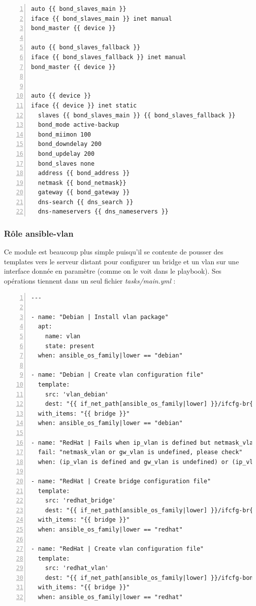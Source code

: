 \documentclass[14 pt,a4paper]{extreport}
\begin{document}
\begin{framed}
\begin{Verbatim}[fontsize=\scriptsize,numbers=left]
auto {{ bond_slaves_main }}
iface {{ bond_slaves_main }} inet manual
bond_master {{ device }}

auto {{ bond_slaves_fallback }}
iface {{ bond_slaves_fallback }} inet manual
bond_master {{ device }}


auto {{ device }}
iface {{ device }} inet static
  slaves {{ bond_slaves_main }} {{ bond_slaves_fallback }}
  bond_mode active-backup
  bond_miimon 100
  bond_downdelay 200
  bond_updelay 200
  bond_slaves none
  address {{ bond_address }}
  netmask {{ bond_netmask}}
  gateway {{ bond_gateway }}
  dns-search {{ dns_search }}
  dns-nameservers {{ dns_nameservers }}

\end{Verbatim}
\end{framed}


\subsubsection*{Rôle ansible-vlan}

Ce module est beaucoup plus simple puisqu'il se contente de pousser des templates vers le serveur distant pour configurer un bridge et un vlan sur une interface donnée en paramètre (comme on le voit dans le playbook). Ses opérations tiennent dans un seul fichier \emph{tasks/main.yml} :


\begin{framed}
\begin{Verbatim}[fontsize=\tiny,numbers=left]
---

- name: "Debian | Install vlan package"
  apt:
    name: vlan
    state: present
  when: ansible_os_family|lower == "debian"

- name: "Debian | Create vlan configuration file"
  template:
    src: 'vlan_debian'
    dest: "{{ if_net_path[ansible_os_family|lower] }}/ifcfg-br{{ item.number }}"
  with_items: "{{ bridge }}"
  when: ansible_os_family|lower == "debian"

- name: "RedHat | Fails when ip_vlan is defined but netmask_vlan & gw_vlan are not"
  fail: "netmask_vlan or gw_vlan is undefined, please check"
  when: (ip_vlan is defined and gw_vlan is undefined) or (ip_vlan is defined and netmask_vlan is undefined)

- name: "RedHat | Create bridge configuration file"
  template:
    src: 'redhat_bridge'
    dest: "{{ if_net_path[ansible_os_family|lower] }}/ifcfg-br{{ item.number }}"
  with_items: "{{ bridge }}"
  when: ansible_os_family|lower == "redhat"

- name: "RedHat | Create vlan configuration file"
  template:
    src: 'redhat_vlan'
    dest: "{{ if_net_path[ansible_os_family|lower] }}/ifcfg-bond0.{{ item.number }}"
  with_items: "{{ bridge }}"
  when: ansible_os_family|lower == "redhat"
\end{Verbatim}
\end{framed}
\end{document}
